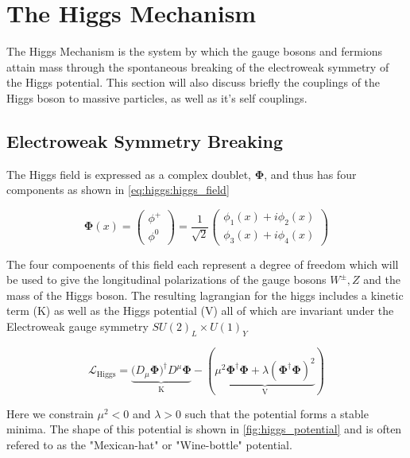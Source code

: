 \section{The Higgs Mechanism} \label{sec:theory:higgs}

The Higgs Mechanism is the system by which the gauge bosons and fermions attain
mass through the spontaneous breaking of the electroweak symmetry of the Higgs
potential.  This section will also discuss briefly the couplings of the Higgs
boson to massive particles, as well as it's self couplings.

\subsection{Electroweak Symmetry Breaking}

The Higgs field is expressed as a complex doublet, $\boldsymbol{\Phi}$, and thus
has four components as shown in \cref{eq:higgs:higgs_field}

\begin{equation} \label{eq:higgs:higgs_field}
\boldsymbol{\Phi}(x) = \left( \begin{matrix} \phi^{+} \\ \phi^{0} \end{matrix}
\right) = \frac{1}{\sqrt{2}} \left( \begin{matrix} \phi_{1}(x) + i\phi_{2}(x) \\
\phi_{3}(x) + i\phi_{4}(x) \end{matrix} \right)
\end{equation}

The four compoenents of this field each represent a degree of freedom which will
be used to give the longitudinal polarizations of the gauge bosons $W^{\pm},Z$
and the mass of the Higgs boson.  The resulting lagrangian for the higgs
includes a kinetic term (K) as well as the Higgs potential (V) all of which are
invariant under the Electroweak gauge symmetry $SU(2)_L \times U(1)_Y$

\begin{equation} \label{eq:higgs:lagrangian}
\mathcal{L}_{\text{Higgs}} =
\underbrace{(D_{\mu}\boldsymbol{\Phi)^{\dagger}}D^{\mu}\boldsymbol{\Phi}}_{\text{K}}
- (\underbrace{\mu^{2}\boldsymbol{\Phi}^{\dagger}\boldsymbol{\Phi} +
  \lambda(\boldsymbol{\Phi}^{\dagger}\boldsymbol{\Phi})^{2}}_{\text{V}})
\end{equation}

Here we constrain $\mu^{2} < 0$ and $\lambda > 0$ such that the potential forms
a stable minima.  The shape of this potential is shown in
\cref{fig:higgs_potential} and is often refered to as the "Mexican-hat" or
"Wine-bottle" potential. 

